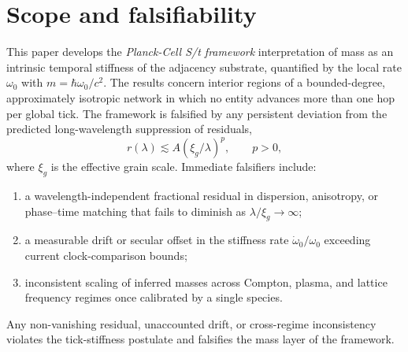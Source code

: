 \section*{Scope and falsifiability}
This paper develops the \emph{Planck-Cell S/t framework} interpretation of
mass as an intrinsic temporal stiffness of the adjacency substrate,
quantified by the local rate $\omega_{0}$ with $m=\hbar\omega_{0}/c^{2}$.
The results concern interior regions of a bounded-degree, approximately
isotropic network in which no entity advances more than one hop per global
tick.  The framework is falsified by any persistent deviation from the
predicted long-wavelength suppression of residuals,
\[
r(\lambda)\lesssim A(\xi_{g}/\lambda)^{p},\qquad p>0,
\]
where $\xi_{g}$ is the effective grain scale.  Immediate falsifiers include:
\begin{enumerate}[label=(\roman*)]
  \item a wavelength-independent fractional residual in dispersion,
        anisotropy, or phase–time matching that fails to diminish as
        $\lambda/\xi_{g}\!\to\!\infty$;
  \item a measurable drift or secular offset in the stiffness rate
        $\dot{\omega}_{0}/\omega_{0}$ exceeding current clock-comparison bounds;
  \item inconsistent scaling of inferred masses across Compton, plasma,
        and lattice frequency regimes once calibrated by a single species.
\end{enumerate}
Any non-vanishing residual, unaccounted drift, or cross-regime inconsistency
violates the tick-stiffness postulate and falsifies the mass layer of the
framework.
